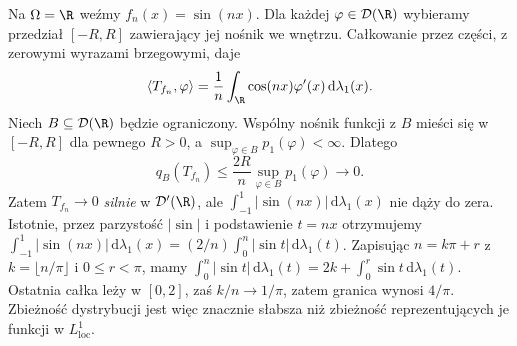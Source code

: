 \begin{przyklad}
\label{ex:oscillations19}
Na $\Omega=\R$ weźmy $f_n(x)=\sin(nx)$.
Dla każdej $\varphi\in\mathcal D(\R)$ wybieramy przedział
$[-R,R]$ zawierający jej nośnik we wnętrzu.
Całkowanie przez części, z zerowymi wyrazami brzegowymi,
daje
\[\langle T_{f_n},\varphi\rangle=
\frac1n\int_\R\cos(nx)\varphi'(x)\,
\mathrm d\lambda_1(x).\]
Niech $B\subseteq\mathcal D(\R)$ będzie ograniczony.
Wspólny nośnik funkcji z $B$ mieści się w $[-R,R]$
dla pewnego $R>0$, a $\sup_{\varphi\in B}p_1(\varphi)<\infty$.
Dlatego
\[q_B(T_{f_n})\le\frac{2R}{n}
\sup_{\varphi\in B}p_1(\varphi)\longrightarrow0.\]
Zatem $T_{f_n}\to0$ \emph{silnie} w $\mathcal D'(\R)$,
ale $\int_{-1}^1|\sin(nx)|\,\mathrm d\lambda_1(x)$
nie dąży do zera. Istotnie, przez parzystość $|\sin|$
i podstawienie $t=nx$ otrzymujemy
$\int_{-1}^1|\sin(nx)|\,\mathrm d\lambda_1(x)
=(2/n)\int_0^n|\sin t|\,\mathrm d\lambda_1(t)$.
Zapisując $n=k\pi+r$ z $k=\lfloor n/\pi\rfloor$ i $0\le r<\pi$,
mamy $\int_0^n|\sin t|\,\mathrm d\lambda_1(t)=2k+\int_0^r\sin t\,\mathrm d\lambda_1(t)$.
Ostatnia całka leży w $[0,2]$, zaś $k/n\to1/\pi$,
zatem granica wynosi $4/\pi$.
Zbieżność dystrybucji jest więc znacznie słabsza niż
zbieżność reprezentujących je funkcji w $L^1_{\mathrm{loc}}$.
\end{przyklad}

